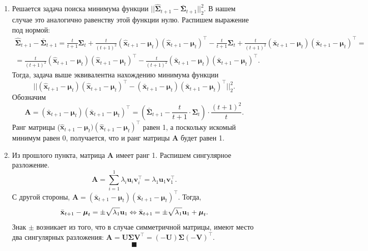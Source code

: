 \documentclass{article}
\begin{document}
\begin{enumerate}
	\item Решается задача поиска минимума функции $||\hat{\mathbf{\Sigma}}_{t+1} - \bar{\mathbf{\Sigma}}_{t+1}||_2^2$. В нашем случае это аналогично равенству этой функции нулю. Распишем выражение под нормой:
	\begin{gather*}
		\hat{\mathbf{\Sigma}}_{t+1} - \bar{\mathbf{\Sigma}}_{t+1} = \frac{t}{t+1}\mathbf{\Sigma}_t + \frac{t}{(t+1)^2}(\hat{\mathbf{x}}_{t+1}-\boldsymbol{\mu}_t)(\hat{\mathbf{x}}_{t+1}-\boldsymbol{\mu}_t)^\intercal - \frac{t}{t+1}\mathbf{\Sigma}_t + \frac{t}{(t+1)^2}(\bar{\mathbf{x}}_{t+1}-\boldsymbol{\mu}_t)(\bar{\mathbf{x}}_{t+1}-\boldsymbol{\mu}_t)^\intercal =\\
		=\frac{t}{(t+1)^2}(\hat{\mathbf{x}}_{t+1}-\boldsymbol{\mu}_t)(\hat{\mathbf{x}}_{t+1}-\boldsymbol{\mu}_t)^\intercal -\frac{t}{(t+1)^2}(\bar{\mathbf{x}}_{t+1}-\boldsymbol{\mu}_t)(\bar{\mathbf{x}}_{t+1}-\boldsymbol{\mu}_t)^\intercal.
 	\end{gather*}
 	Тогда, задача выше эквивалентна нахождению минимума функции \[||(\hat{\mathbf{x}}_{t+1}-\boldsymbol{\mu}_t)(\hat{\mathbf{x}}_{t+1}-\boldsymbol{\mu}_t)^\intercal-(\bar{\mathbf{x}}_{t+1}-\boldsymbol{\mu}_t)(\bar{\mathbf{x}}_{t+1}-\boldsymbol{\mu}_t)^\intercal||_2^2.\]
 	Обозначим \[\mathbf{A} = (\bar{\mathbf{x}}_{t+1}-\boldsymbol{\mu}_t)(\bar{\mathbf{x}}_{t+1}-\boldsymbol{\mu}_t)^\intercal = \left(\bar{\mathbf{\Sigma}}_{t+1} - \frac{t}{t+1} \cdot \mathbf{\Sigma}_t \right) \cdot \frac{(t+1)^2}{t}.\]
 	Ранг матрицы ($\hat{\mathbf{x}}_{t+1}-\boldsymbol{\mu}_t)(\hat{\mathbf{x}}_{t+1}-\boldsymbol{\mu}_t)^\intercal$ равен 1, а поскольку искомый минимум равен 0, получается, что и ранг матрицы $\mathbf{A}$ будет равен 1.
 	
 	\item Из прошлого пункта, матрица $\mathbf{A}$ имеет ранг 1. Распишем сингулярное разложение. \[
 		\mathbf{A} = \sum_{i=1}^{1} \lambda_i \mathbf{u}_i \mathbf{v}_i^\intercal = \lambda_1 \mathbf{u}_1 \mathbf{v}_1^\intercal.
 	\]
 	С другой стороны, $\mathbf{A} = (\bar{\mathbf{x}}_{t+1}-\boldsymbol{\mu}_t)(\bar{\mathbf{x}}_{t+1}-\boldsymbol{\mu}_t)^\intercal$. Тогда, \[
 	\bar{\mathbf{x}}_{t+1}-\boldsymbol{\mu}_t = \pm\sqrt{\lambda_1} \mathbf{u}_1 \Leftrightarrow\\
 	\bar{\mathbf{x}}_{t+1} = \pm\sqrt{\lambda_1} \mathbf{u}_1 + \boldsymbol{\mu}_t.
 	\]
 	Знак $\pm$ возникает из того, что в случае симметричной матрицы, имеют место два сингулярных разложения: $\mathbf{A}=\mathbf{U}\mathbf{\Sigma} \mathbf{V}^\intercal=(-\mathbf{U})\mathbf{\Sigma} (-\mathbf{V})^\intercal$.
 	$$ \blacksquare $$
\end{enumerate}
\end{document}
